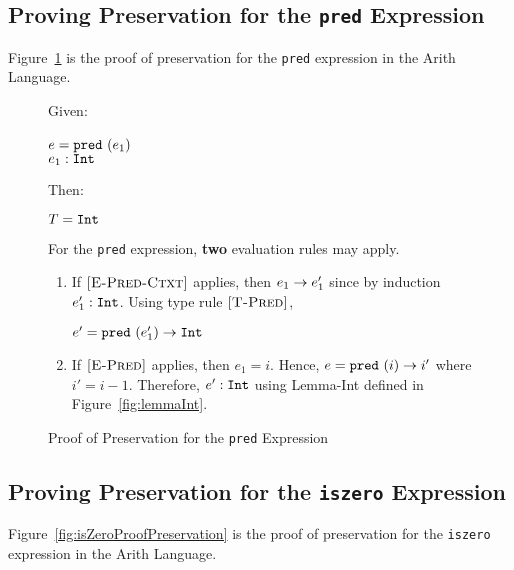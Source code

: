 \documentclass{report}
\newcommand{\rel}[1]{\mbox{\sc [#1]}}
\begin{document}
\subsection{Proving Preservation for the \texttt{pred} Expression}

Figure~\ref{fig:predProofPreservation} is the proof of preservation for the \texttt{pred} expression in the Arith Language.

\begin{figure}[ht!]
Given:
\begin{center}
   $e = \mbox{\tt pred}~(e_1)$~\\
   ${e_1} : {\mbox{\tt Int}}$
\end{center}
Then:
\begin{center}
   $T = \mbox{\tt Int}$
\end{center}
For the \texttt{pred} expression, \textbf{two} evaluation rules may apply.
\begin{enumerate}

    \item If $\rel{E-Pred-Ctxt}$ applies, then ${e_1} \rightarrow {e'_1}$ since by induction ${e'_1} : {\mbox{\tt Int}}$.  Using type rule $\rel{T-Pred}$,
    
    \begin{center}
      ${e' = \mbox{\tt pred}~(e'_1)} \rightarrow {\mbox{\tt Int}}$
    \end{center}
      
    \item If $\rel{E-Pred}$ applies, then $e_1 = i$.  Hence, ${e = \mbox{\tt pred}~(i)} \rightarrow {i'}$ where $i' = i - 1$.  Therefore, ${e'} : {\mbox{\tt Int}}$ using Lemma-Int defined in Figure~\ref{fig:lemmaInt}.
    
\end{enumerate}

  \caption{Proof of Preservation for the \texttt{pred} Expression}\label{fig:predProofPreservation}
\end{figure} 

\subsection{Proving Preservation for the \texttt{iszero} Expression}

Figure~\ref{fig:isZeroProofPreservation} is the proof of preservation for the \texttt{iszero} expression in the Arith Language.
\end{document}
